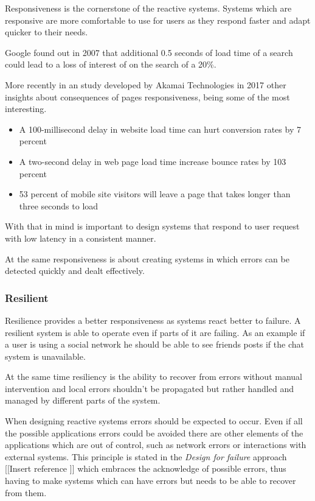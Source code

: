 \documentclass[../main.tex]{subfiles}
\begin{document}
Responsiveness is the cornerstone of the reactive
systems. Systems which are responsive are more comfortable to use for users as
they respond faster and adapt quicker to their needs.

Google found out in 2007 that additional 0.5 seconds of load time of a search
could lead to a loss of interest of on the search of a 20\%.

More recently in an study developed by Akamai Technologies in 2017 other
insights about consequences of pages responsiveness, being some of the most
interesting.

\begin{itemize}
    \item A 100-millisecond delay in website load time can hurt conversion rates
by 7 percent

    \item A two-second delay in web page load time increase bounce rates by 103
percent

    \item 53 percent of mobile site visitors will leave a page that takes longer
than three seconds to load
\end{itemize}

With that in mind is important to design systems that respond to user request
with low latency in a consistent manner.

At the same responsiveness is about creating systems in which errors can be
detected quickly and dealt effectively.

\subsubsection{Resilient}

Resilience provides a better responsiveness as systems
react better to failure. A resilient system is able to operate even if parts of
it are failing. As an example if a user is using a social network he should be
able to see friends posts if the chat system is unavailable.

At the same time resiliency is the ability to recover from errors without manual
intervention and local errors shouldn't be propagated but rather handled and
managed by different parts of the system.

When designing reactive systems errors should be expected to occur. Even if all
the possible applications errors could be avoided there are other elements of
the applications which are out of control, such as network errors or
interactions with external systems. This principle is stated in the
\textit{Design for failure} approach [[Insert reference ]] which embraces the
acknowledge of possible errors, thus having to make systems which can have
errors but needs to be able to recover from them.
\end{document}
